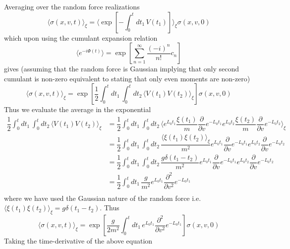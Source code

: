 \documentclass[aps,prb,onecolumn,notitlepage,showpacs,floatfix,superscriptaddress]{revtex4-1}
\begin{document}
Averaging over the random force realizations
\begin{equation}
\langle \sigma(x,v,t) \rangle_\xi = \langle \exp\left[-\int_0^t dt_1 \, V(t_1) \right] \rangle_\xi  \sigma(x,v,0)
\end{equation}
which upon using the cumulant expansion relation 
\begin{equation}
\langle e^{-i \Phi(t)} \rangle = \exp \left[ \sum_{n=1}^{\infty} \dfrac{(-i )^n}{n!} c_n \right]
\end{equation}
gives (assuming that the random force is Gaussian implying that only second cumulant is non-zero equivalent to stating that only even moments are non-zero)
\begin{equation}
\langle \sigma(x,v,t) \rangle_\xi = \exp\left[\dfrac{1}{2}\int_0^t dt_1 \, \int_0^t dt_2 \, \langle V(t_1) V(t_2)\rangle_\xi \right]   \sigma(x,v,0)
\end{equation}
Thus we evaluate the average in the exponential
\begin{equation}
\begin{split}
\dfrac{1}{2}\int_0^t dt_1 \, \int_0^t dt_2 \, \langle V(t_1) V(t_2)\rangle_\xi &= \dfrac{1}{2}\int_0^t dt_1 \, \int_0^t dt_2 \, \langle e^{L_0 t_1} \dfrac{\xi(t_1)}{m} \dfrac{\partial}{\partial v} e^{-L_0 t_1} e^{L_0 t_2} \dfrac{\xi(t_2)}{m} \dfrac{\partial}{\partial v} e^{-L_0 t_2}\rangle_\xi \\
&= \dfrac{1}{2}\int_0^t dt_1 \, \int_0^t dt_2 \, \dfrac{\langle \xi(t_1) \xi(t_2)\rangle_\xi}{m^2}   e^{L_0 t_1}  \dfrac{\partial}{\partial v} e^{-L_0 t_1} e^{L_0 t_2} \dfrac{\partial}{\partial v} e^{-L_0 t_2} \\
&= \dfrac{1}{2}\int_0^t dt_1 \, \int_0^t dt_2 \, \dfrac{g \delta(t_1-t_2)}{m^2}   e^{L_0 t_1}  \dfrac{\partial}{\partial v} e^{-L_0 t_1} e^{L_0 t_2} \dfrac{\partial}{\partial v} e^{-L_0 t_2} \\
&= \dfrac{1}{2}\int_0^t dt_1 \, \dfrac{g}{m^2}   e^{L_0 t_1}  \dfrac{\partial^2}{\partial v^2} e^{-L_0 t_1} \\
\end{split}
\end{equation}
where we have used the Gaussian nature of the random force i.e. $\langle \xi(t_1) \xi(t_2)\rangle_\xi = g \delta(t_1-t_2)$. Thus
\begin{equation}
\langle \sigma(x,v,t) \rangle_\xi = \exp\left[\dfrac{g}{2m^2}\int_0^t dt_1 \,  e^{L_0 t_1}  \dfrac{\partial^2}{\partial v^2} e^{-L_0 t_1}\right]   \sigma(x,v,0)
\end{equation}
Taking the time-derivative of the above equation
\end{document}

